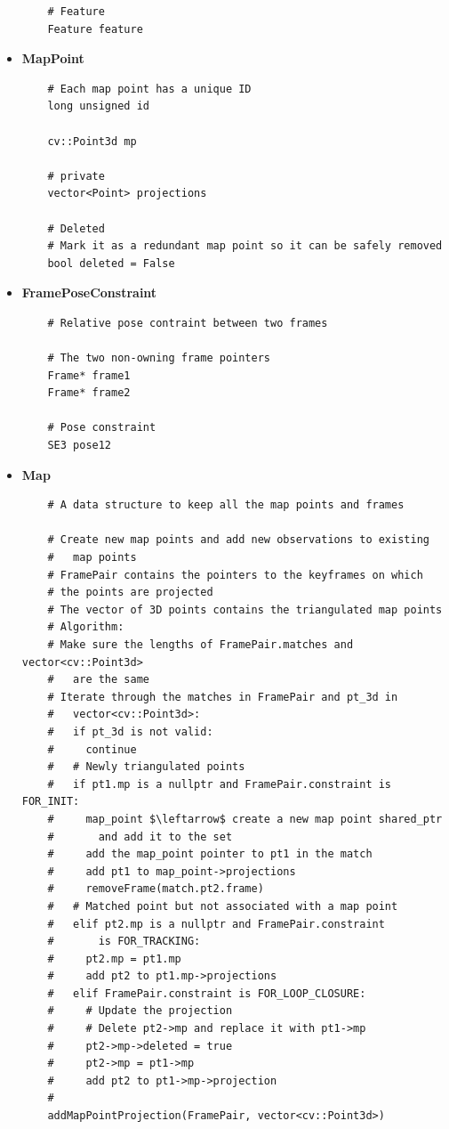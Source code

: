 \begin{itemize}
\begin{verbatim}
    # Feature
    Feature feature    
  \end{verbatim}

  \item \textbf{MapPoint}
  \begin{verbatim}
    # Each map point has a unique ID
    long unsigned id

    cv::Point3d mp

    # private
    vector<Point> projections

    # Deleted
    # Mark it as a redundant map point so it can be safely removed
    bool deleted = False
  \end{verbatim}

  \item \textbf{FramePoseConstraint}
  \begin{lstlisting}
    # Relative pose contraint between two frames
    
    # The two non-owning frame pointers
    Frame* frame1 
    Frame* frame2

    # Pose constraint
    SE3 pose12

  \end{lstlisting}

  \item \textbf{Map}
  \begin{lstlisting}
    # A data structure to keep all the map points and frames

    # Create new map points and add new observations to existing
    #   map points
    # FramePair contains the pointers to the keyframes on which 
    # the points are projected
    # The vector of 3D points contains the triangulated map points
    # Algorithm:
    # Make sure the lengths of FramePair.matches and vector<cv::Point3d>
    #   are the same
    # Iterate through the matches in FramePair and pt_3d in 
    #   vector<cv::Point3d>:
    #   if pt_3d is not valid: 
    #     continue
    #   # Newly triangulated points
    #   if pt1.mp is a nullptr and FramePair.constraint is FOR_INIT:
    #     map_point $\leftarrow$ create a new map point shared_ptr 
    #       and add it to the set
    #     add the map_point pointer to pt1 in the match
    #     add pt1 to map_point->projections
    #     removeFrame(match.pt2.frame)
    #   # Matched point but not associated with a map point
    #   elif pt2.mp is a nullptr and FramePair.constraint 
    #       is FOR_TRACKING:
    #     pt2.mp = pt1.mp 
    #     add pt2 to pt1.mp->projections
    #   elif FramePair.constraint is FOR_LOOP_CLOSURE:
    #     # Update the projection 
    #     # Delete pt2->mp and replace it with pt1->mp
    #     pt2->mp->deleted = true
    #     pt2->mp = pt1->mp
    #     add pt2 to pt1->mp->projection
    #     
    addMapPointProjection(FramePair, vector<cv::Point3d>)



\end{lstlisting}
\end{itemize}
